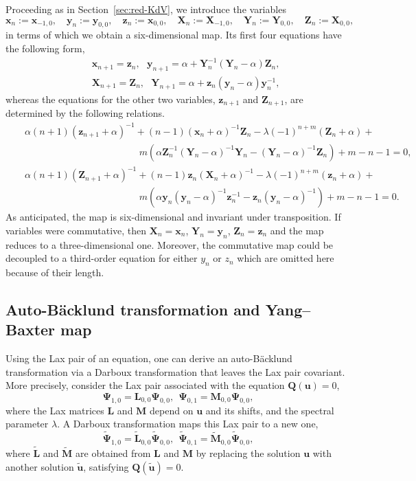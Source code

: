 \documentclass[dvips,10pt]{article}
\newcommand{\bs}{\boldsymbol}
\newcommand{\bsu}{ {\bs{u}}}
\newcommand{\bsx}{ {\bs{x}}}
\newcommand{\bsz}{ {\bs{z}}}
\newcommand{\bsy}{ {\bs{y}}}
\newcommand{\bsX}{ {\bs{X}}}
\newcommand{\bsY}{ {\bs{Y}}}
\newcommand{\bsZ}{ {\bs{Z}}}
\theoremstyle{remark} %
\begin{document}
	Proceeding as in Section~\ref{sec:red-KdV}, we introduce the variables 
	\[
	\bsx_n := \bsx_{-1,0}, \quad \bsy_n := \bsy_{0,0}, \quad \bsz_n := \bsx_{0,0}, \quad 
	\bsX_n := \bsX_{-1,0}, \quad \bsY_n := \bsY_{0,0}, \quad \bsZ_n := \bsX_{0,0},
	\]
	in terms of which we obtain a six-dimensional map. Its first four equations have the following form,
	\begin{eqnarray*}
			&&{\bs{x}}_{n+1} = {\bs{z}}_n, ~~~  {\bs{y}}_{n+1} = \alpha + {\bs{Y}}_{n}^{-1} ({\bs{Y}}_{n}-\alpha) {\bs{Z}}_{n},  \\
			&& {\bs{X}}_{n+1} = {\bs{Z}}_n , ~~~ {\bs{Y}}_{n+1} = \alpha + {\bs{z}}_{n} ({\bs{y}}_{n}-\alpha) {\bs{y}}_{n}^{-1},
		\end{eqnarray*}
whereas the equations for the other two variables, ${\bs{z}}_{n+1}$ and ${\bs{Z}}_{n+1}$, are determined by the following relations.
	\begin{eqnarray*}
	&& \alpha (n+1) (\bsz_{n+1}+\alpha)^{-1} + (n-1) (\bsx_n+\alpha)^{-1} {\bs{Z}}_n - \lambda (-1)^{n+m} ({\bs{Z}}_n+ \alpha)  + \nonumber \\
	&& \hspace{5cm} m \left(\alpha {\bs{Z}}_n^{-1} (\bsY_n-\alpha)^{-1} \bsY_n - (\bsY_n - \alpha)^{-1} {\bs{Z}}_n\right) + m-n-1 =0,  \\
	&& \alpha (n+1) (\bsZ_{n+1}+\alpha)^{-1} + (n-1) {\bs{z}}_n (\bsX_n+\alpha)^{-1} - \lambda (-1)^{n+m} ({\bs{z}}_n+ \alpha)  + \nonumber \\
	&& \hspace{5cm} m \left(\alpha \bsy_n (\bsy_n-\alpha)^{-1} {\bs{z}}_n^{-1} - {\bs{z}}_n (\bsy_n - \alpha)^{-1} \right) + m-n-1 =0.
	\end{eqnarray*}	
	As anticipated, the map is six-dimensional and invariant under transposition. If variables were commutative, then $\bsX_n=\bsx_n$, $\bsY_n=\bsy_n$, $\bsZ_n=\bsz_n$ and the map reduces to a  three-dimensional one. Moreover, the commutative map could be decoupled to a third-order equation for either $y_n$ or $z_n$ which are omitted here because of their length.
	
	\subsection{Auto-B\"acklund transformation and Yang--Baxter map}
	
	Using the Lax pair of an equation, one can derive an auto-B\"acklund transformation via a Darboux transformation that leaves the Lax pair covariant. More precisely, consider the Lax pair associated with the equation ${\bs{Q}}(\bsu) = 0$,
	$$	{\bs{\Psi}}_{1,0} = \bs{L}_{0,0} \bs{\Psi}_{0,0} , ~~ \bs{\Psi}_{0,1} = \bs{M}_{0,0} \bs{\Psi}_{0,0},$$
	where the Lax matrices $\bs{L}$ and $\bs{M}$ depend on $\bsu$ and its shifts, and the spectral parameter $\lambda$. A Darboux transformation maps this Lax pair to a new one,
	$$	\tilde{\bs{\Psi}}_{1,0} = \tilde{\bs{L}}_{0,0} \tilde{\bs{\Psi}}_{0,0} , ~~ \tilde{\bs{\Psi}}_{0,1} = \tilde{\bs{M}}_{0,0} \tilde{\bs{\Psi}}_{0,0},$$
	where $\tilde{\bs{L}}$ and $\tilde{\bs{M}}$ are obtained from $\bs{L}$ and $\bs{M}$ by replacing the solution $\bsu$ with another solution $\tilde{\bsu}$, satisfying ${\bs{Q}}(\tilde{\bsu}) = 0$. 
	
\end{document}
